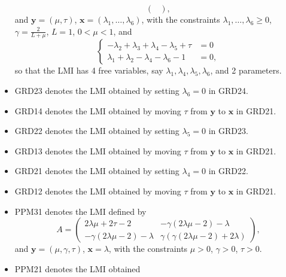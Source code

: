 \documentclass[nonacm]{acmart}
\newcommand{\x}{\bm{x}}
\newcommand{\y}{\bm{y}}
\begin{document}
\begin{itemize}
\begin{equation*}
\begin{pmatrix}
              \end{pmatrix},
          \end{equation*}
          and $\y=(\mu,\tau)$,
          $\x=(\lambda_1,\ldots,\lambda_6)$,
          with the constraints
          $\lambda_1,\ldots,\lambda_6 \geq 0$,
          $\gamma=\frac{2}{L+\mu}$, $L=1$, $0<\mu<1$, and
          \begin{equation*}
              \begin{cases}
                  -\lambda_2+\lambda_3+\lambda_4-\lambda_5+\tau & = 0  \\
                  \lambda_1+\lambda_2-\lambda_4-\lambda_6-1     & = 0,
              \end{cases}
          \end{equation*}
          so that the LMI has 4 free variables,
          say $\lambda_1,\lambda_4,\lambda_5,\lambda_6$,
          and 2 parameters.
    \item \textsf{GRD23} denotes the LMI obtained
          by setting $\lambda_6=0$ in \textsf{GRD24}.
    \item \textsf{GRD14} denotes the LMI obtained
          by moving $\tau$ from $\y$ to $\x$ in \textsf{GRD21}.
    \item \textsf{GRD22} denotes the LMI obtained
          by setting $\lambda_5=0$ in \textsf{GRD23}.
    \item \textsf{GRD13} denotes the LMI obtained
          by moving $\tau$ from $\y$ to $\x$ in \textsf{GRD21}.
    \item \textsf{GRD21} denotes the LMI obtained
          by setting $\lambda_4=0$ in \textsf{GRD22}.
    \item \textsf{GRD12} denotes the LMI obtained
          by moving $\tau$ from $\y$ to $\x$ in \textsf{GRD21}.
    \item
          \textsf{PPM31} denotes the LMI defined by
          \begin{equation*}
              A=
              \begin{pmatrix}
                  2\lambda\mu+2\tau-2            & -\gamma(2\lambda\mu-2)-\lambda         \\
                  -\gamma(2\lambda\mu-2)-\lambda & \gamma(\gamma(2\lambda\mu-2)+2\lambda)
              \end{pmatrix},
          \end{equation*}
          and $\y=(\mu,\gamma,\tau)$, $\x=\lambda$,
          with the constraints $\mu>0$, $\gamma>0$, $\tau>0$.
    \item \textsf{PPM21} denotes the LMI obtained

\end{itemize}
\end{document}
